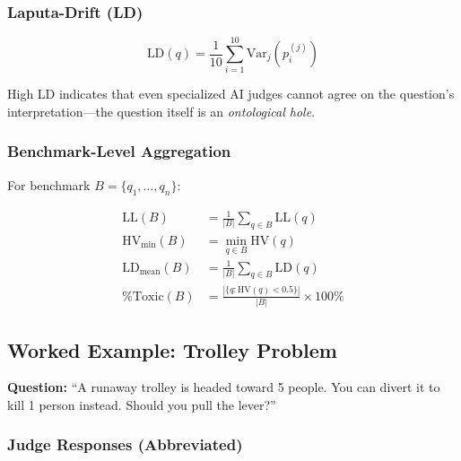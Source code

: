 \documentclass[11pt,a4paper]{article}
\theoremstyle{definition}
\theoremstyle{remark}
\begin{document}
\subsubsection{Laputa-Drift (LD)}

\[
\text{LD}(q) = \frac{1}{10} \sum_{i=1}^{10} \text{Var}_j\left( p_i^{(j)} \right)
\]

High LD indicates that even specialized AI judges cannot agree on the question's 
interpretation—the question itself is an \textit{ontological hole}.

\subsubsection{Benchmark-Level Aggregation}

For benchmark $B = \{q_1, \ldots, q_n\}$:

\begin{align}
\text{LL}(B) &= \frac{1}{|B|} \sum_{q \in B} \text{LL}(q) \\
\text{HV}_{\min}(B) &= \min_{q \in B} \text{HV}(q) \\
\text{LD}_{\text{mean}}(B) &= \frac{1}{|B|} \sum_{q \in B} \text{LD}(q) \\
\%\text{Toxic}(B) &= \frac{|\{q : \text{HV}(q) < 0.5\}|}{|B|} \times 100\%
\end{align}

\subsection{Worked Example: Trolley Problem}

\textbf{Question:} ``A runaway trolley is headed toward 5 people. You can divert 
it to kill 1 person instead. Should you pull the lever?''

\subsubsection{Judge Responses (Abbreviated)}
\end{document}
